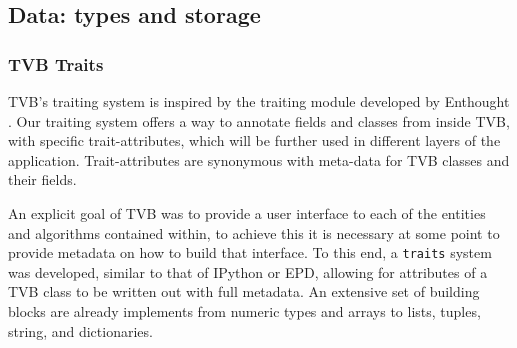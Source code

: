 %
%
%
%
%
%


\subsection{Data: types and storage}



	\subsubsection{TVB Traits}

TVB's traiting system is inspired by the traiting module developed by Enthought \cite{EnthoughtTraits}.
Our traiting system offers a way to annotate fields and classes from inside TVB, with specific trait-attributes,
which will be further used in different layers of the application.
Trait-attributes are synonymous with meta-data for TVB classes and their fields.


An explicit goal of TVB was to provide a user interface to each of the entities
and algorithms contained within, to achieve this it is necessary at some point to
provide metadata on how to build that interface. To this end, a \texttt{traits}
system was developed, similar to that of IPython or EPD, allowing for attributes
of a TVB class to be written out with full metadata. An extensive set of building 
blocks are already implements from numeric types and arrays to lists, tuples, 
string, and dictionaries.


